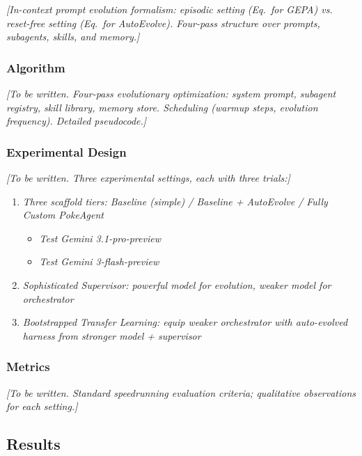 \textit{[In-context prompt evolution formalism: episodic setting (Eq.~for GEPA) vs. reset-free setting (Eq.~for AutoEvolve). Four-pass structure over prompts, subagents, skills, and memory.]}

\subsubsection{Algorithm}\label{sec:algorithm}

\textit{[To be written. Four-pass evolutionary optimization: system prompt, subagent registry, skill library, memory store. Scheduling (warmup steps, evolution frequency). Detailed pseudocode.]}

\subsubsection{Experimental Design}\label{sec:experimental_design}

\textit{[To be written. Three experimental settings, each with three trials:]}

\begin{enumerate}
    \item \textit{Three scaffold tiers: Baseline (simple) / Baseline + AutoEvolve / Fully Custom PokeAgent}
    \begin{itemize}
        \item \textit{Test Gemini 3.1-pro-preview}
        \item \textit{Test Gemini 3-flash-preview}
    \end{itemize}
    \item \textit{Sophisticated Supervisor: powerful model for evolution, weaker model for orchestrator}
    \item \textit{Bootstrapped Transfer Learning: equip weaker orchestrator with auto-evolved harness from stronger model + supervisor}
\end{enumerate}

\subsubsection{Metrics}\label{sec:autoevolve_metrics}

\textit{[To be written. Standard speedrunning evaluation criteria; qualitative observations for each setting.]}

\subsection{Results}\label{sec:results}

